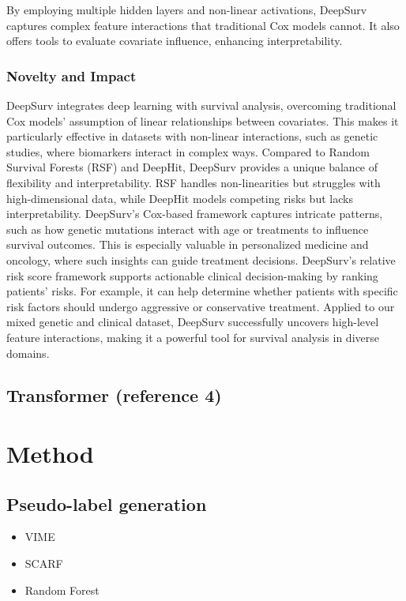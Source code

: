 \documentclass[conference]{ieeeconf}
\begin{document}
By employing multiple hidden layers and non-linear activations, DeepSurv captures complex feature interactions that traditional Cox models cannot. It also offers tools to evaluate covariate influence, enhancing interpretability. 

\subsubsection{Novelty and Impact}
DeepSurv integrates deep learning with survival analysis, overcoming traditional Cox models' assumption of linear relationships between covariates. This makes it particularly effective in datasets with non-linear interactions, such as genetic studies, where biomarkers interact in complex ways.
Compared to Random Survival Forests (RSF) and DeepHit, DeepSurv provides a unique balance of flexibility and interpretability. RSF handles non-linearities but struggles with high-dimensional data, while DeepHit models competing risks but lacks interpretability. DeepSurv’s Cox-based framework captures intricate patterns, such as how genetic mutations interact with age or treatments to influence survival outcomes. This is especially valuable in personalized medicine and oncology, where such insights can guide treatment decisions.
DeepSurv’s relative risk score framework supports actionable clinical decision-making by ranking patients’ risks. For example, it can help determine whether patients with specific risk factors should undergo aggressive or conservative treatment. Applied to our mixed genetic and clinical dataset, DeepSurv successfully uncovers high-level feature interactions, making it a powerful tool for survival analysis in diverse domains.


\subsection{Transformer (reference 4)}



\section{Method}

\subsection{Pseudo-label generation}
\begin{itemize}
   \item VIME
   \item SCARF
   \item Random Forest
\end{itemize}
\end{document}
